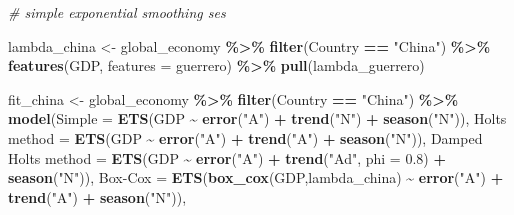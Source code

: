 \documentclass[
]{article}
\newenvironment{Shaded}{\begin{snugshade}}{\end{snugshade}}
\newcommand{\AttributeTok}[1]{\textcolor[rgb]{0.13,0.29,0.53}{#1}}
\newcommand{\CommentTok}[1]{\textcolor[rgb]{0.56,0.35,0.01}{\textit{#1}}}
\newcommand{\FloatTok}[1]{\textcolor[rgb]{0.00,0.00,0.81}{#1}}
\newcommand{\FunctionTok}[1]{\textcolor[rgb]{0.13,0.29,0.53}{\textbf{#1}}}
\newcommand{\NormalTok}[1]{#1}
\newcommand{\OtherTok}[1]{\textcolor[rgb]{0.56,0.35,0.01}{#1}}
\newcommand{\SpecialCharTok}[1]{\textcolor[rgb]{0.81,0.36,0.00}{\textbf{#1}}}
\newcommand{\StringTok}[1]{\textcolor[rgb]{0.31,0.60,0.02}{#1}}
\begin{document}
\begin{Shaded}
\begin{Highlighting}[]
\CommentTok{\# simple exponential smoothing ses}

\NormalTok{lambda\_china }\OtherTok{\textless{}{-}}\NormalTok{ global\_economy }\SpecialCharTok{\%\textgreater{}\%}
  \FunctionTok{filter}\NormalTok{(Country }\SpecialCharTok{==} \StringTok{"China"}\NormalTok{) }\SpecialCharTok{\%\textgreater{}\%}
  \FunctionTok{features}\NormalTok{(GDP, }\AttributeTok{features =}\NormalTok{ guerrero) }\SpecialCharTok{\%\textgreater{}\%}
  \FunctionTok{pull}\NormalTok{(lambda\_guerrero)}

\NormalTok{fit\_china }\OtherTok{\textless{}{-}}\NormalTok{ global\_economy }\SpecialCharTok{\%\textgreater{}\%}
  \FunctionTok{filter}\NormalTok{(Country }\SpecialCharTok{==} \StringTok{"China"}\NormalTok{) }\SpecialCharTok{\%\textgreater{}\%}
  \FunctionTok{model}\NormalTok{(}\StringTok{\textasciigrave{}}\AttributeTok{Simple}\StringTok{\textasciigrave{}} \OtherTok{=} \FunctionTok{ETS}\NormalTok{(GDP }\SpecialCharTok{\textasciitilde{}} \FunctionTok{error}\NormalTok{(}\StringTok{"A"}\NormalTok{) }\SpecialCharTok{+} \FunctionTok{trend}\NormalTok{(}\StringTok{"N"}\NormalTok{) }\SpecialCharTok{+} \FunctionTok{season}\NormalTok{(}\StringTok{"N"}\NormalTok{)),}
        \StringTok{\textasciigrave{}}\AttributeTok{Holt\textquotesingle{}s method}\StringTok{\textasciigrave{}} \OtherTok{=} \FunctionTok{ETS}\NormalTok{(GDP }\SpecialCharTok{\textasciitilde{}} \FunctionTok{error}\NormalTok{(}\StringTok{"A"}\NormalTok{) }\SpecialCharTok{+} \FunctionTok{trend}\NormalTok{(}\StringTok{"A"}\NormalTok{) }\SpecialCharTok{+} \FunctionTok{season}\NormalTok{(}\StringTok{"N"}\NormalTok{)),}
        \StringTok{\textasciigrave{}}\AttributeTok{Damped Holt\textquotesingle{}s method}\StringTok{\textasciigrave{}} \OtherTok{=} \FunctionTok{ETS}\NormalTok{(GDP }\SpecialCharTok{\textasciitilde{}} \FunctionTok{error}\NormalTok{(}\StringTok{"A"}\NormalTok{) }\SpecialCharTok{+} \FunctionTok{trend}\NormalTok{(}\StringTok{"Ad"}\NormalTok{, }\AttributeTok{phi =} \FloatTok{0.8}\NormalTok{) }\SpecialCharTok{+} \FunctionTok{season}\NormalTok{(}\StringTok{"N"}\NormalTok{)),}
        \StringTok{\textasciigrave{}}\AttributeTok{Box{-}Cox}\StringTok{\textasciigrave{}} \OtherTok{=} \FunctionTok{ETS}\NormalTok{(}\FunctionTok{box\_cox}\NormalTok{(GDP,lambda\_china) }\SpecialCharTok{\textasciitilde{}} \FunctionTok{error}\NormalTok{(}\StringTok{"A"}\NormalTok{) }\SpecialCharTok{+} \FunctionTok{trend}\NormalTok{(}\StringTok{"A"}\NormalTok{) }\SpecialCharTok{+} \FunctionTok{season}\NormalTok{(}\StringTok{"N"}\NormalTok{)),}

\end{Highlighting}
\end{Shaded}
\end{document}
